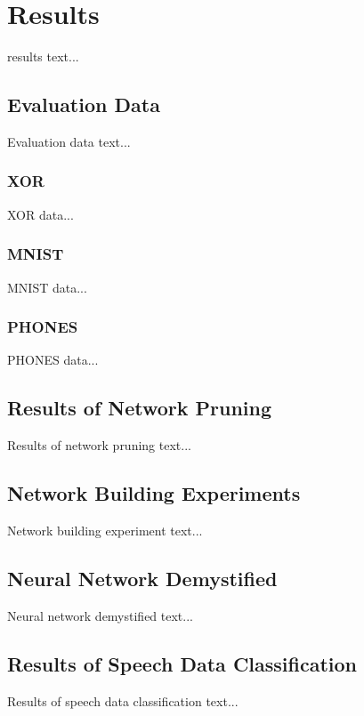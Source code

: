 \chapter{Results} \label{chap:results}
results text...

\section{Evaluation Data} \label{sec:evaluation_data}
Evaluation data text...

\subsection{XOR} \label{ssec:xor}
XOR data...

\subsection{MNIST} \label{ssec:mnist}
MNIST data... \citep{online:mnist}

\subsection{PHONES} \label{ssec:phones}
PHONES data...

\section{Results of Network Pruning} \label{sec:results_of_network_pruning}
Results of network pruning text...

\section{Network Building Experiments} \label{sec:network_building_experiments}
Network building experiment text...

\section{Neural Network Demystified} \label{sec:neural_network_demystified}
Neural network demystified text...

\section{Results of Speech Data Classification} \label{sec:results_of_speech_data_classification}
Results of speech data classification text...
